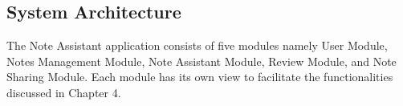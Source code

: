 %
%
%                 
 
\label{sec:designandimplementationissues}    %


\subsection{System Architecture}
\label{sec:systemarchitecture}

The Note Assistant application consists of five modules namely User Module, Notes Management Module, Note Assistant Module, Review Module, and Note Sharing Module. Each module has its own view to facilitate the functionalities discussed in Chapter 4.


